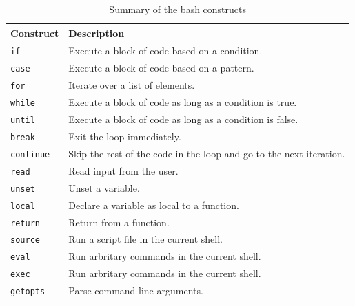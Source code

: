 \begin{table}[h!]
  \caption{Summary of the bash constructs}
  \begin{tabularx}{\linewidth}{l >{\raggedright\arraybackslash}X}
    \toprule
    \textbf{Construct} & \textbf{Description} \\
    \midrule
    \lstinline|if| & Execute a block of code based on a condition. \\
    \lstinline|case| & Execute a block of code based on a pattern. \\
    \lstinline|for| & Iterate over a list of elements. \\
    \lstinline|while| & Execute a block of code as long as a condition is true. \\
    \lstinline|until| & Execute a block of code as long as a condition is false. \\
    \lstinline|break| & Exit the loop immediately. \\
    \lstinline|continue| & Skip the rest of the code in the loop and go to the next iteration. \\
    \lstinline|read| & Read input from the user. \\
    \lstinline|unset| & Unset a variable. \\
    \lstinline|local| & Declare a variable as local to a function. \\
    \lstinline|return| & Return from a function. \\
    \lstinline|source| & Run a script file in the current shell. \\
    \lstinline|eval| & Run arbritary commands in the current shell. \\
    \lstinline|exec| & Run arbritary commands in the current shell. \\
    \lstinline|getopts| & Parse command line arguments. \\
    \bottomrule
  \end{tabularx}
\end{table}
